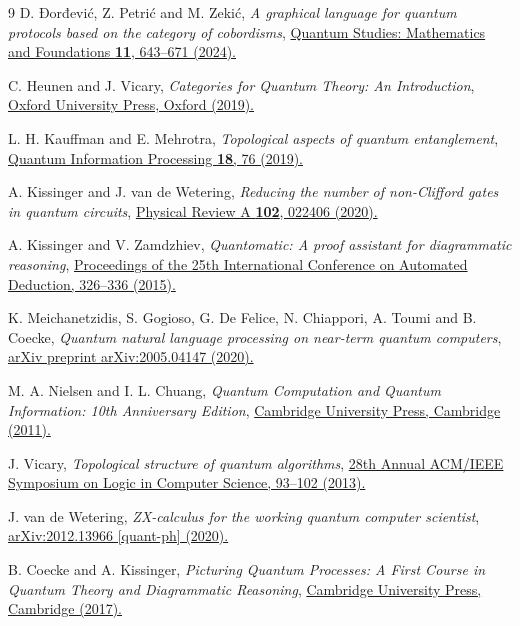 \documentclass[a4paper,twocolumn,11pt,unpublished]{quantumarticle}
\numberwithin{equation}{section}
\begin{document}
\begin{thebibliography}{9}
D. Đorđević, Z. Petrić and M. Zekić, \textit{A graphical language for quantum protocols based on the category of cobordisms}, \href{https://arxiv.org/pdf/0804.3587}{Quantum Studies: Mathematics and Foundations \textbf{11}, 643--671 (2024).}

C. Heunen and J. Vicary, \textit{Categories for Quantum Theory: An Introduction}, \href{https://doi.org/10.1093/oso/9780198739623.001.0001}{Oxford University Press, Oxford (2019).}

L. H. Kauffman and E. Mehrotra, \textit{Topological aspects of quantum entanglement}, \href{https://doi.org/10.1007/s11128-019-2191-z}{Quantum Information Processing \textbf{18}, 76 (2019).}

A. Kissinger and J. van de Wetering, \textit{Reducing the number of non-Clifford gates in quantum circuits}, \href{https://doi.org/10.1103/PhysRevA.102.022406}{Physical Review A \textbf{102}, 022406 (2020).}

A. Kissinger and V. Zamdzhiev, \textit{Quantomatic: A proof assistant for diagrammatic reasoning}, \href{https://doi.org/10.1007/978-3-319-21401-6_22}{Proceedings of the 25th International Conference on Automated Deduction, 326--336 (2015).}

K. Meichanetzidis, S. Gogioso, G. De Felice, N. Chiappori, A. Toumi and B. Coecke, \textit{Quantum natural language processing on near-term quantum computers}, \href{https://arxiv.org/abs/2005.04147}{arXiv preprint arXiv:2005.04147 (2020).}

M. A. Nielsen and I. L. Chuang, \textit{Quantum Computation and Quantum Information: 10th Anniversary Edition}, \href{https://doi.org/10.1017/CBO9780511976667}{Cambridge University Press, Cambridge (2011).}

J. Vicary, \textit{Topological structure of quantum algorithms}, \href{https://doi.org/10.1109/LICS.2013.14}{28th Annual ACM/IEEE Symposium on Logic in Computer Science, 93--102 (2013).}

J. van de Wetering, \textit{ZX-calculus for the working quantum computer scientist}, \href{https://doi.org/10.48550/arXiv.2012.13966}{arXiv:2012.13966 [quant-ph] (2020).}

B. Coecke and A. Kissinger, \textit{Picturing Quantum Processes: A First Course in Quantum Theory and Diagrammatic Reasoning}, \href{https://doi.org/10.1017/9781316219317}{Cambridge University Press, Cambridge (2017).}


\end{thebibliography}
\end{document}
